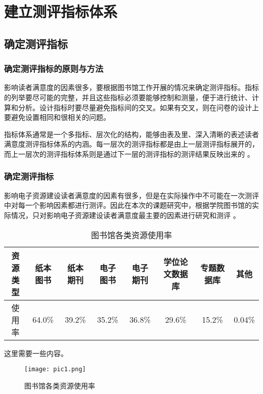 \section{建立测评指标体系}
    \subsection{确定测评指标}
        \subsubsection{确定测评指标的原则与方法}
            影响读者满意度的因素很多，要根据图书馆工作开展的情况来确定测评指标。指标的列举要尽可能的完整，并且这些指标必须要能够控制和测量，便于进行统计、计算和分析。设计指标时要尽量避免指标间的交叉。如果有交叉，则在问卷的设计上要避免设置相同和很相关的问题。

            指标体系通常是一个多指标、层次化的结构，能够由表及里、深入清晰的表述读者满意度测评指标体系的内涵。每一层次的测评指标都是由上一层测评指标展开的，而上一层次的测评指标体系则是通过下一层的测评指标的测评结果反映出来的 。
        \subsubsection{确定测评指标}
            影响电子资源建设读者满意度的因素有很多，但是在实际操作中不可能在一次测评中对每一个影响因素都进行测评。因此在本次的课题研究中，根据学院图书馆的实际情况，只对影响电子资源建设读者满意度最主要的因素进行研究和测评 。

            \begin{table}[h]
                \caption{图书馆各类资源使用率}
                \begin{tabular}{|c|c|c|c|c|c|c|c|}
                    \hline 
                    资源类型 & 纸本图书 & 纸本期刊 & 电子图书 & 电子期刊 & 学位论文数据库 & 专题数据库 & 其他 \\
                    \hline
                    使用率 & 64.0\% & 39.2\% & 35.2\% & 36.8\% & 29.6\% & 15.2\% & 0.04\% \\
                    \hline
                \end{tabular}
            \end{table}

            这里需要一些内容。
            
            \begin{figure}[h]
                \texttt{[image: pic1.png]}
                \caption{图书馆各类资源使用率}
            \end{figure}